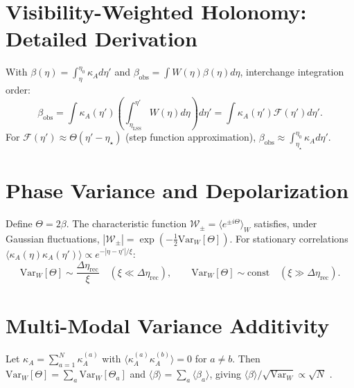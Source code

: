 \documentclass[12pt]{article}
\theoremstyle{definition}
\newcommand{\kA}{\kappa_A}
\newcommand{\Wrec}{\Delta\eta_{\mathrm{rec}}}
\newcommand{\betaobs}{\beta_{\mathrm{obs}}}
\newcommand{\etaLSS}{\eta_{\mathrm{LSS}}}
\newcommand{\etastar}{\eta_\star}
\newcommand{\etaobs}{\eta_0}
\newcommand{\Wpm}{\mathcal{W}_\pm}
\newcommand{\VarW}{\mathrm{Var}_W}
\begin{document}
\section{Visibility-Weighted Holonomy: Detailed Derivation}
\label{app:visibility}

With $\beta(\eta)=\int_\eta^{\etaobs}\kA d\eta'$ and
$\betaobs=\int W(\eta)\beta(\eta)d\eta$, interchange integration order:
\begin{equation}
  \betaobs
  = \int\kA(\eta')\left(\int_{\etaLSS}^{\eta'}W(\eta)d\eta\right)d\eta'
  = \int\kA(\eta')\mathcal{F}(\eta')d\eta'.
\end{equation}
For $\mathcal{F}(\eta')\approx\Theta(\eta'-\etastar)$
(step function approximation),
$\betaobs\approx\int_{\etastar}^{\etaobs}\kA d\eta'$.

\section{Phase Variance and Depolarization}
\label{app:variance}

Define $\Theta=2\beta$.
The characteristic function
$\Wpm=\langle e^{\pm i\Theta}\rangle_W$
satisfies, under Gaussian fluctuations,
$|\Wpm|=\exp(-\tfrac{1}{2}\VarW[\Theta])$.
For stationary correlations $\langle\kA(\eta)\kA(\eta')\rangle
\propto e^{-|\eta-\eta'|/\xi}$:
\begin{equation}
  \VarW[\Theta]\sim\frac{\Wrec}{\xi}
  \quad(\xi\ll\Wrec),
  \qquad
  \VarW[\Theta]\sim\mathrm{const}
  \quad(\xi\gg\Wrec).
\end{equation}

\section{Multi-Modal Variance Additivity}
\label{app:multimodal}

Let $\kA=\sum_{a=1}^N\kA^{(a)}$ with
$\langle\kA^{(a)}\kA^{(b)}\rangle=0$ for $a\neq b$.
Then $\VarW[\Theta]=\sum_a\VarW[\Theta_a]$ and
$\langle\beta\rangle=\sum_a\langle\beta_a\rangle$, giving
$\langle\beta\rangle/\sqrt{\VarW}\propto\sqrt{N}$
\cite{Rice1954,Papoulis1991}.
\end{document}
